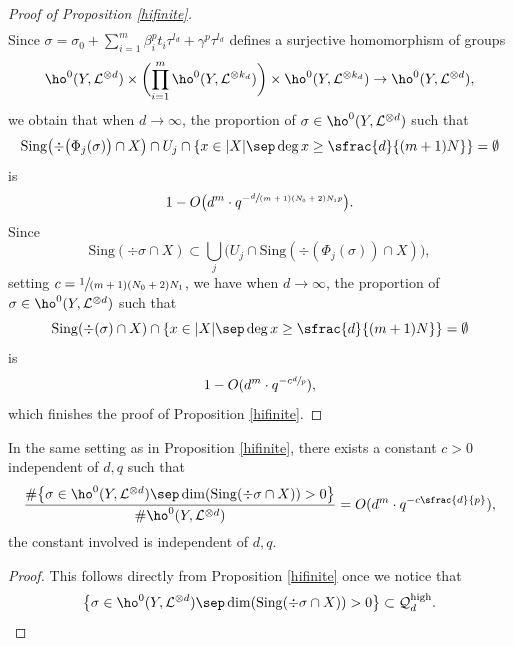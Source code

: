 \begin{proof}[Proof of Proposition \ref{hifinite}]
\begin{align*}
\end{align*}
Since $\sigma=\sigma_0+\sum_{i=1}^{m} \beta_i^pt_i\tau^{l_d}+\gamma^p\tau^{l_d}$ defines a surjective homomorphism of groups
\[
\ho^0(Y,\mathcal{L}^{\otimes d})\times \biggl(\prod_{i=1}^m \ho^0(Y,\mathcal{L}^{\otimes k_d}) \biggr) \times \ho^0(Y, \mathcal{L}^{\otimes k_d}) \to \ho^0(Y, \mathcal{L}^{\otimes d}),
\]
we obtain that when $d\to \infty$, the proportion of $\sigma\in \ho^0(Y, \mathcal{L}^{\otimes d})$ such that
\[
\mathrm{Sing}\bigl(\div \big(\Phi_j(\sigma)\big)\cap X\bigr) \cap U_j\cap \left\{ x\in |X|\sep \deg x\geq\sfrac{d}{(m+1)N} \right\}=\emptyset
\]
is
\[
1-O\bigl(d^{m}\cdot q^{-\sfrac{d}{(m+1)(N_0+2)N_1 p}}\bigr).
\]
Since
\[
\mathrm{Sing}(\div \sigma\cap X)\subset \bigcup_{j} \bigl(U_j\cap \mathrm{Sing}(\div (\Phi_j(\sigma))\cap X)\bigr),
\]
setting $c=\sfrac{1}{(m+1)(N_0+2)N_1}$, we have when $d\to \infty$, the proportion of $\sigma\in \ho^0(Y, \mathcal{L}^{\otimes d})$ such that
\[
\mathrm{Sing}(\div (\sigma)\cap X) \cap \left\{ x\in |X|\sep \deg x\geq\sfrac{d}{(m+1)N} \right\}=\emptyset
\]
is
\[
1-O(d^{m}\cdot q^{-c\sfrac{d}{p}}),
\]
which finishes the proof of Proposition \ref{hifinite}.
\end{proof}

\begin{cor}\label{hidim}
In the same setting as in Proposition \ref{hifinite}, there exists a constant $c>0$ independent of $d,q$ such that
\[
\frac{ \#\bigl\{ \sigma \in \ho^0(Y, \mathcal{L}^{\otimes d})\sep \dim(\mathrm{Sing}(\div \sigma\cap X))>0 \bigr\}}{\# \ho^0(Y, \mathcal{L}^{\otimes d})}=O(d^{m}\cdot q^{-c\sfrac{d}{p}}),
\]
the constant involved is independent of $d,q$.
\end{cor}
\begin{proof}
This follows directly from Proposition \ref{hifinite} once we notice that
\[
\left\{ \sigma \in \ho^0(Y, \mathcal{L}^{\otimes d})\sep \dim(\mathrm{Sing}(\div \sigma\cap X))>0 \right\}\subset \mathcal{Q}_{d}^{\mathrm{high}}.\qedhere
\]
\end{proof}
\Changelback


